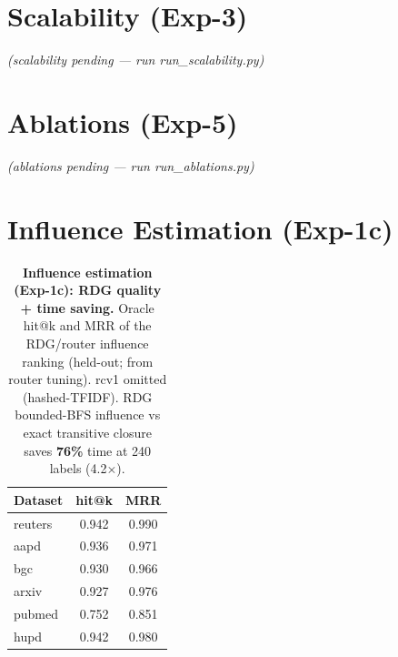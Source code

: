 \documentclass[11pt]{article}
\begin{document}
\section{Scalability (Exp-3)}
\emph{(scalability pending — run run\_scalability.py)}
\section{Ablations (Exp-5)}
\emph{(ablations pending — run run\_ablations.py)}
\section{Influence Estimation (Exp-1c)}
\begin{table}[h]\centering\footnotesize
\caption{\textbf{Influence estimation (Exp-1c): RDG quality + time saving.} Oracle hit@k and
MRR of the RDG/router influence ranking (held-out; from router tuning). rcv1 omitted
(hashed-TFIDF). RDG bounded-BFS influence vs exact transitive closure saves \textbf{76\%} time at 240 labels (4.2$\times$).}
\label{tab:mrr}
\begin{tabular}{lcc}
\toprule
Dataset & hit@k & MRR \\
\midrule
\quad reuters & 0.942 & 0.990 \\
\quad aapd & 0.936 & 0.971 \\
\quad bgc & 0.930 & 0.966 \\
\quad arxiv & 0.927 & 0.976 \\
\quad pubmed & 0.752 & 0.851 \\
\quad hupd & 0.942 & 0.980 \\
\bottomrule
\end{tabular}
\end{table}
\end{document}
